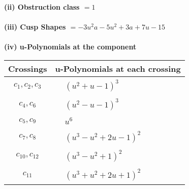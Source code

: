 \documentclass[1p]{elsarticle_modified}
\theoremstyle{definition}
\begin{document}
\flushleft \textbf{(ii) Obstruction class $= 1$}\\~\\
\flushleft \textbf{(iii) Cusp Shapes $= -3 u^2 a-5 u^2+3 a+7 u-15$}\\~\\
\newpage\renewcommand{\arraystretch}{1}
\flushleft \textbf{(iv) u-Polynomials at the component}\newline \\
\begin{tabular}{m{50pt}|m{274pt}}
Crossings & \hspace{64pt}u-Polynomials at each crossing \\
\hline $$\begin{aligned}c_{1},c_{2},c_{3}\end{aligned}$$&$\begin{aligned}
&(u^2+u-1)^3
\end{aligned}$\\
\hline $$\begin{aligned}c_{4},c_{6}\end{aligned}$$&$\begin{aligned}
&(u^2- u-1)^3
\end{aligned}$\\
\hline $$\begin{aligned}c_{5},c_{9}\end{aligned}$$&$\begin{aligned}
&u^6
\end{aligned}$\\
\hline $$\begin{aligned}c_{7},c_{8}\end{aligned}$$&$\begin{aligned}
&(u^3- u^2+2 u-1)^2
\end{aligned}$\\
\hline $$\begin{aligned}c_{10},c_{12}\end{aligned}$$&$\begin{aligned}
&(u^3- u^2+1)^2
\end{aligned}$\\
\hline $$\begin{aligned}c_{11}\end{aligned}$$&$\begin{aligned}
&(u^3+u^2+2 u+1)^2
\end{aligned}$\\
\hline
\end{tabular}\\~\\
\end{document}

